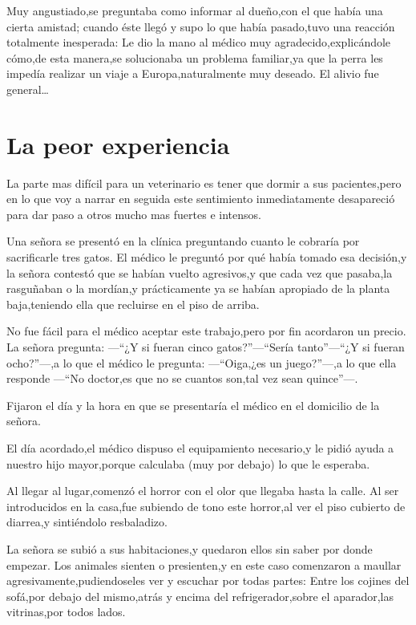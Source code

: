 \documentclass[letterpaper,12pt]{book}
\begin{document}
Muy angustiado,se preguntaba como informar al dueño,con el que había una cierta amistad; cuando éste llegó y supo lo que había pasado,tuvo una reacción totalmente inesperada: Le dio la mano al médico muy agradecido,explicándole cómo,de esta manera,se solucionaba un problema familiar,ya que la perra les impedía realizar un viaje a Europa,naturalmente muy deseado. El alivio fue general\ldots

\chapter{La peor experiencia}

La parte mas difícil para un veterinario es tener que dormir a sus pacientes,pero en lo que voy a narrar en seguida este sentimiento inmediatamente desapareció para dar paso a otros mucho mas fuertes e intensos.

Una señora se presentó en la clínica preguntando cuanto le cobraría por sacrificarle tres gatos. El médico le preguntó por qué había tomado esa decisión,y la señora contestó que se habían vuelto agresivos,y que cada vez que pasaba,la rasguñaban o la mordían,y prácticamente ya se habían apropiado de la planta baja,teniendo ella que recluirse en el piso de arriba.

No fue fácil para el médico aceptar este trabajo,pero por fin acordaron un precio. La señora pregunta: ---``¿Y si fueran cinco gatos?''---``Sería tanto''---``¿Y si fueran ocho?''---,a lo que el médico le pregunta: ---``Oiga,¿es un juego?''---,a lo que ella responde ---``No doctor,es que no se cuantos son,tal vez sean quince''---. 

Fijaron el día y la hora en que se presentaría el médico en el domicilio de la señora.

El día acordado,el médico dispuso el equipamiento necesario,y le pidió ayuda a nuestro hijo mayor,porque calculaba (muy por debajo) lo que le esperaba. 

Al llegar al lugar,comenzó el horror con el olor que llegaba hasta la calle. Al ser introducidos en la casa,fue subiendo de tono este horror,al ver el piso cubierto de diarrea,y sintiéndolo resbaladizo.

La señora se subió a sus habitaciones,y quedaron ellos sin saber por donde empezar. Los animales sienten o presienten,y en este caso comenzaron a maullar agresivamente,pudiendoseles ver y escuchar por todas partes: Entre los cojines del sofá,por debajo del mismo,atrás y encima del refrigerador,sobre el aparador,las vitrinas,por todos lados. 
\end{document}
